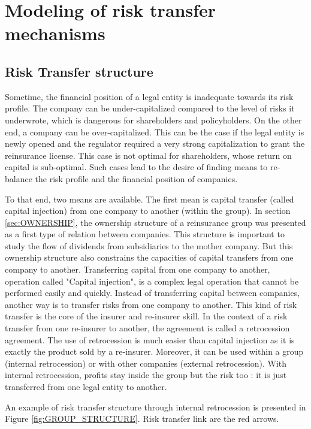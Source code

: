 \section{Modeling of risk transfer mechanisms}

\subsection{Risk Transfer structure}

Sometime, the financial position of a legal entity is inadequate towards its risk profile. The company can be under-capitalized compared to the level of risks it underwrote, which is dangerous for shareholders and policyholders. On the other end, a company can be over-capitalized. This can be the case if the legal entity is newly opened and the regulator required a very strong capitalization to grant the reinsurance license. This case is not optimal for shareholders, whose return on capital is sub-optimal. Such cases lead to the desire of finding means to re-balance the risk profile and the financial position of companies. 

To that end, two means are available. The first mean is capital transfer (called capital injection) from one company to another (within the group). In section \ref{sec:OWNERSHIP}, the ownership structure of a reinsurance group was presented as a first type of relation between companies. This structure is important to study the flow of dividends from subsidiaries to the mother company. But this ownership structure also constrains the capacities of capital transfers from one company to another. Transferring capital from one company to another, operation called "Capital injection", is a complex legal operation that cannot be performed easily and quickly.
Instead of transferring capital between companies, another way is to transfer risks from one company to another. This kind of risk transfer is the core of the insurer and re-insurer skill. In the context of a risk transfer from one re-insurer to another, the agreement is called a retrocession agreement. The use of retrocession is much easier than capital injection as it is exactly the product sold by a re-insurer. Moreover, it can be used within a group (internal retrocession) or with other companies (external retrocession). With internal retrocession, profits stay inside the group but the risk too : it is just transferred from one legal entity to another.

An example of risk transfer structure through internal retrocession is presented in Figure \ref{fig:GROUP_STRUCTURE}. Risk transfer link are the red arrows.

